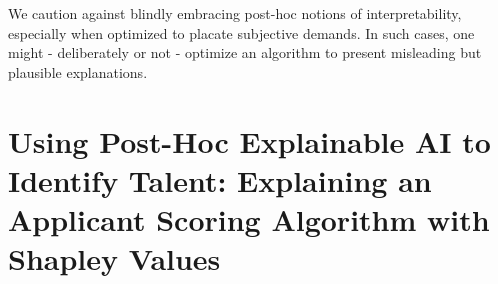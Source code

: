 \begin{savequote}[8cm]
    We caution against blindly embracing post-hoc notions of interpretability, especially when optimized to placate subjective demands. In such cases, one might - deliberately or not - optimize an algorithm to present misleading but plausible explanations.
\end{savequote}

\chapter{\label{ch:xai}Using Post-Hoc Explainable AI to Identify Talent: Explaining an Applicant Scoring Algorithm with Shapley Values}

